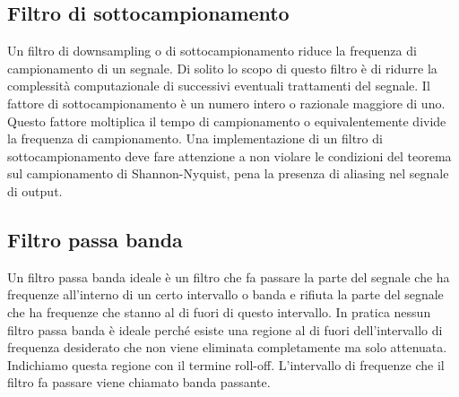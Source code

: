 \subsection{Filtro di sottocampionamento}
Un filtro di downsampling o di sottocampionamento riduce la frequenza di campionamento di un segnale. Di solito lo scopo di questo filtro \`e di ridurre la complessit\`a computazionale di successivi eventuali trattamenti del segnale. Il fattore di sottocampionamento \`e un numero intero o razionale maggiore di uno. Questo fattore moltiplica il tempo di campionamento o equivalentemente divide la frequenza di campionamento. Una implementazione di un filtro di sottocampionamento deve fare attenzione a non violare le condizioni del teorema sul campionamento di Shannon-Nyquist, pena la presenza di aliasing nel segnale di output. 


\subsection{Filtro passa banda}
Un filtro passa banda ideale \`e un filtro che fa passare la parte del segnale che ha frequenze all'interno di un certo intervallo o banda e rifiuta la parte del segnale che ha frequenze che stanno al di fuori di questo intervallo. In pratica nessun filtro passa banda \`e ideale perch\'e esiste una regione al di fuori dell'intervallo di frequenza desiderato che non viene eliminata completamente ma solo attenuata. Indichiamo questa regione con il termine roll-off. L'intervallo di frequenze che il filtro fa passare viene chiamato banda passante.

